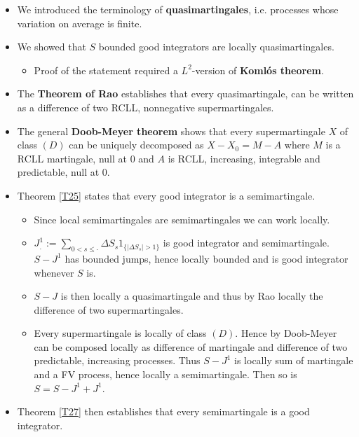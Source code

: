 \documentclass[12pt,a4paper, twoside]{article}
\theoremstyle{definition}
\begin{document}
\begin{itemize}
\item We introduced the terminology of \textbf{quasimartingales}, i.e. processes whose variation on average is finite.
\item We showed that $S$ bounded good integrators are locally quasimartingales.
\begin{itemize}
\item Proof of the statement required a $L^2$-version of \textbf{Komlós theorem}.
\end{itemize}
\item The \textbf{Theorem of Rao} establishes that every quasimartingale, can be written as a difference of two RCLL, nonnegative supermartingales. 
\item The general \textbf{Doob-Meyer theorem} shows that every supermartingale $X$ of class $(D)$ can be uniquely decomposed as $X-X_0=M-A$ where $M$ is a RCLL martingale,  null at $0$ and $A$ is RCLL, increasing, integrable and predictable, null at $0$.
\item Theorem \ref{T25} states that every good integrator is a semimartingale. 
\begin{itemize}
\item Since local semimartingales are semimartingales  we can work locally.
\item $J_.^1:= \sum_{0 < s \leq \cdot} \Delta S_s1_{\{ | \Delta S_s| > 1\}}$ is good integrator and semimartingale. $S-J^1$ has bounded jumps, hence locally bounded and is good integrator whenever $S$ is.
\item $S-J$ is then locally a quasimartingale and thus by Rao locally the difference of two supermartingales.
\item Every supermartingale is locally of class $(D)$. Hence by Doob-Meyer can be composed locally as difference of martingale and difference of two predictable, increasing processes. Thus $S-J^1$ is locally sum of martingale and a FV process, hence locally a semimartingale. Then so is $S=S-J^1+J^1$.
\end{itemize}
\item Theorem \ref{T27} then establishes that every semimartingale is a good integrator.
\end{itemize}
\newpage
\end{document}
